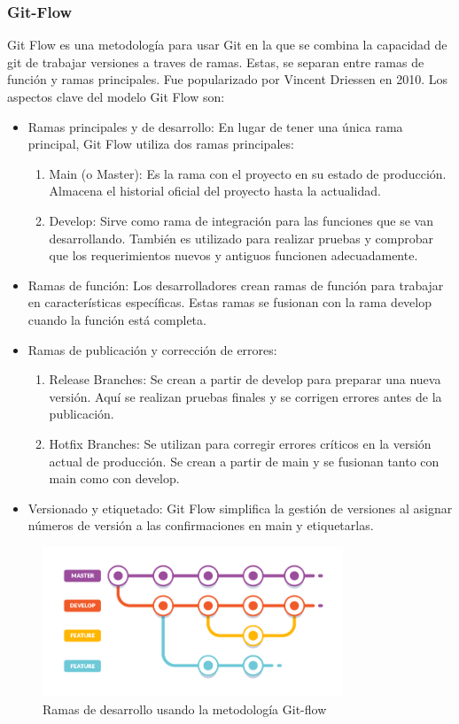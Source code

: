 \subsubsection{Git-Flow}
Git Flow es una metodología para usar Git en la que se combina la capacidad de git de trabajar versiones a traves de ramas. Estas, se separan entre ramas de función y ramas principales. Fue popularizado por Vincent Driessen en 2010. Los aspectos clave del modelo Git Flow son:
\begin{itemize}
\item Ramas principales y de desarrollo: En lugar de tener una única rama principal, Git Flow utiliza dos ramas principales:
\begin{enumerate}
\item Main (o Master): Es la rama con el proyecto en su estado de producción. Almacena el historial oficial del proyecto hasta la actualidad.
\item Develop: Sirve como rama de integración para las funciones que se van desarrollando. También es utilizado para realizar pruebas y comprobar que los requerimientos nuevos y antiguos funcionen adecuadamente.
\end{enumerate}
\item Ramas de función: Los desarrolladores crean ramas de función para trabajar en características específicas. Estas ramas se fusionan con la rama develop cuando la función está completa.
\item Ramas de publicación y corrección de errores:
\begin{enumerate}
\item Release Branches: Se crean a partir de develop para preparar una nueva versión. Aquí se realizan pruebas finales y se corrigen errores antes de la publicación.
\item Hotfix Branches: Se utilizan para corregir errores críticos en la versión actual de producción. Se crean a partir de main y se fusionan tanto con main como con develop.
\end{enumerate}
\item Versionado y etiquetado: Git Flow simplifica la gestión de versiones al asignar números de versión a las confirmaciones en main y etiquetarlas.
\end{itemize}

\begin{figure}[ht]
\vspace*{-20pt}
\centering
\includegraphics[width=0.8\textwidth]{Figuras/gitflow.png}
\caption{\label{fig:gitflow}Ramas de desarrollo usando la metodología Git-flow}
\vspace*{-10pt}
\end{figure}

